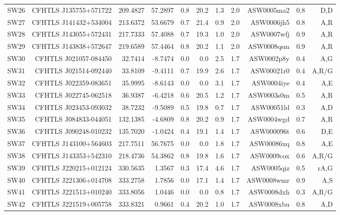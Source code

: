 \documentclass[useAMS,usenatbib,a4paper]{mn2e}
\begin{document}
\begin{center}
\begin{longtable}{lrrrrrrrrrr}
SW26 & CFHTLS J135755+571722 &  209.4827 &   57.2897 &  0.8 & 20.2 &  1.3 &  2.0 & ASW0005ma2 &  0.8  &  D,D   \\
SW27 & CFHTLS J141432+534004 &  213.6372 &   53.6679 &  0.7 & 21.4 &  0.9 &  2.0 & ASW0006jh5 &  0.8  &  A,R   \\
SW28 & CFHTLS J143055+572431 &  217.7333 &   57.4088 &  0.7 & 19.3 &  1.0 &  2.0 & ASW0007wfj &  0.9  &  A,R   \\
SW29 & CFHTLS J143838+572647 &  219.6589 &   57.4464 &  0.8 & 20.2 &  1.1 &  2.0 & ASW0008qsm &  0.9  &  A,R   \\
SW30 & CFHTLS J021057-084450 &   32.7414 &   -8.7474 &  0.0 &  0.0 &  2.5 &  1.7 & ASW0002p8y &  0.4  &  A,G   \\
SW31 & CFHTLS J021514-092440 &   33.8109 &   -9.4111 &  0.7 & 19.9 &  2.6 &  1.7 & ASW00021r0 &  0.4  &  A,R/G   \\
SW32 & CFHTLS J022359-083651 &   35.9995 &   -8.6143 &  0.0 &  0.0 &  3.1 &  1.7 & ASW0004iye &  0.4  &  A,E   \\
SW33 & CFHTLS J022745-062518 &   36.9387 &   -6.4218 &  0.6 & 20.5 &  1.2 &  1.7 & ASW0003s0m &  0.5  &  A,R   \\
SW34 & CFHTLS J023453-093032 &   38.7232 &   -9.5089 &  0.5 & 19.8 &  0.7 &  1.7 & ASW00051ld &  0.3  &  A,D   \\
SW35 & CFHTLS J084833-044051 &  132.1385 &   -4.6809 &  0.8 & 20.2 &  0.9 &  1.7 & ASW0004wgd &  0.7  &  A,R   \\
SW36 & CFHTLS J090248-010232 &  135.7020 &   -1.0424 &  0.4 & 19.1 &  1.4 &  1.7 & ASW000096t &  0.6  &  D,E   \\
SW37 & CFHTLS J143100+564603 &  217.7511 &   56.7675 &  0.0 &  0.0 &  1.8 &  1.7 & ASW00086xq &  0.8  &  A,E   \\
SW38 & CFHTLS J143353+542310 &  218.4736 &   54.3862 &  0.8 & 19.8 &  1.6 &  1.7 & ASW0009cox &  0.6  &  A,R/G   \\
SW39 & CFHTLS J220215+012124 &  330.5635 &    1.3567 &  0.3 & 17.4 &  4.6 &  1.7 & ASW0005qiz &  0.5  &  rA,G   \\
SW40 & CFHTLS J221306+014708 &  333.2758 &    1.7856 &  0.0 & 17.1 &  1.4 &  1.7 & ASW0008wmr &  0.9  &  A,S   \\
SW41 & CFHTLS J221513+010240 &  333.8056 &    1.0446 &  0.0 &  0.0 &  0.8 &  1.7 & ASW0008dxh &  0.3  &  A,R/G   \\
SW42 & CFHTLS J221519+005758 &  333.8321 &    0.9661 &  0.4 & 20.2 &  1.0 &  1.7 & ASW0008xbu &  0.8  &  A,D   \\

\end{longtable}
\end{center}
\end{document}

